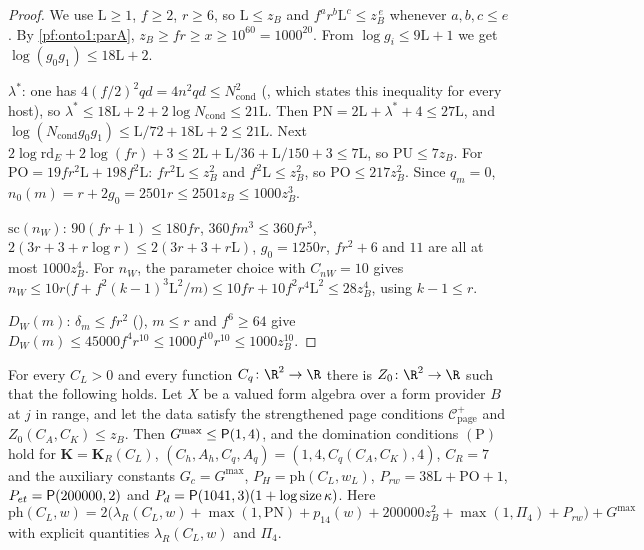 \begin{proof}
We use $\mathrm L\ge1$, $f\ge2$, $r\ge6$, so $\mathrm L\le z_B$ and $f^ar^b\mathrm L^c\le z_B^{\,e}$ whenever $a,b,c\le e$. By
\cref{pf:onto1:parA}, $z_B\ge fr\ge x\ge10^{60}=1000^{20}$. From $\log g_i\le9\mathrm L+1$ we get $\log(g_0g_1)\le18\mathrm L+2$.

$\lambda^*$: one has $4(f/2)^2qd=4n^2qd\le N_{\mathrm{cond}}^2$ (, which states this
inequality for every host), so $\lambda^*\le18\mathrm L+2+2\log N_{\mathrm{cond}}\le21\mathrm L$. Then $\mathrm{PN}=2\mathrm L+\lambda^*+4\le
27\mathrm L$, and $\log(N_{\mathrm{cond}}g_0g_1)\le\mathrm L/72+18\mathrm L+2\le21\mathrm L$. Next $2\log\mathrm{rd}_E+2\log(fr)+3\le2\mathrm
L+\mathrm L/36+\mathrm L/150+3\le7\mathrm L$, so $\mathrm{PU}\le7z_B$. For $\mathrm{PO}=19fr^2\mathrm L+198f^2\mathrm L$: $fr^2\mathrm L\le
z_B^2$ and $f^2\mathrm L\le z_B^2$, so $\mathrm{PO}\le217z_B^2$. Since $q_m=0$, $n_0(m)=r+2g_0=2501r\le2501z_B\le1000z_B^3$.

$\mathrm{sc}(n_W)$: $90(fr+1)\le180fr$, $360fm^3\le360fr^3$, $2(3r+3+r\log r)\le2(3r+3+r\mathrm L)$, $g_0=1250r$, $fr^2+6$
and $11$ are all at most $1000z_B^4$. For $n_W$, the parameter choice with $C_{nW}=10$ gives
$n_W\le10r\bigl(f+f^2(k-1)^3\mathrm L^2/m\bigr)\le10fr+10f^2r^4\mathrm L^2\le28z_B^4$, using $k-1\le r$.

$D_W(m)$: $\delta_m\le fr^2$ (), $m\le r$ and $f^6\ge64$ give
$D_W(m)\le45000f^4r^{10}\le1000f^{10}r^{10}\le1000z_B^{10}$.
\end{proof}

\begin{proposition}\label{pf:onto1:polyDom}
For every $C_L>0$ and every function $C_q\colon\R^2\to\R$ there is $Z_0\colon\R^2\to\R$ such that the following holds. Let
$X$ be a valued form algebra over a form provider $B$ at $j$ in range, and let the data satisfy the strengthened page
conditions $\mathcal C^+_{\mathrm{page}}$ and $Z_0(C_A,C_K)\le z_B$. Then $G^{\max}\le\mathsf{P}(1,4)$, and the domination
conditions $(\mathrm P)$ hold for $\mathbf K=\mathbf K_R(C_L)$, $(C_h,A_h,C_q,A_q)=(1,4,C_q(C_A,C_K),4)$, $C_R=7$ and the auxiliary
constants $G_c=G^{\max}$, $P_H=\mathrm{ph}(C_L,w_L)$, $P_{rw}=38\mathrm L+\mathrm{PO}+1$, $P_{et}=\mathsf{P}(200000,2)$ and
$P_d=\mathsf{P}(1041,3)(1+\log\operatorname{size}\kappa)$. Here
\[
\mathrm{ph}(C_L,w)=2\bigl(\lambda_R(C_L,w)+\max(1,\mathrm{PN})+p_{14}(w)+200000z_B^2+\max(1,\Pi_4)+P_{rw}\bigr)+G^{\max}
\]
with explicit quantities $\lambda_R(C_L,w)$ and $\Pi_4$.
\end{proposition}

